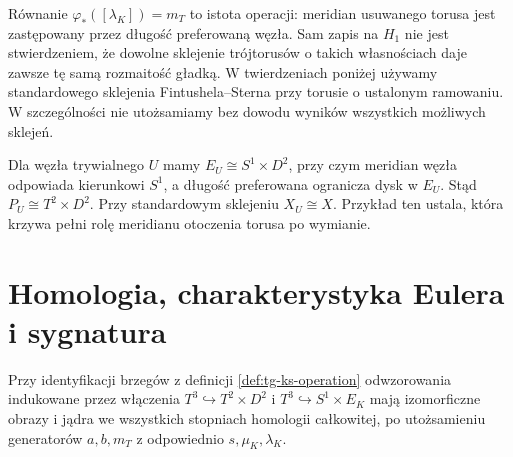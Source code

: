 \begin{uwaga}
Równanie $\varphi_*([\lambda_K])=m_T$ to istota
operacji: meridian usuwanego torusa jest zastępowany
przez długość preferowaną węzła. Sam zapis na $H_1$
nie jest stwierdzeniem, że dowolne sklejenie trójtorusów
o takich własnościach daje zawsze tę samą rozmaitość
gładką. W twierdzeniach poniżej używamy standardowego
sklejenia Fintushela--Sterna przy torusie o ustalonym
ramowaniu. W szczególności nie utożsamiamy bez dowodu
wyników wszystkich możliwych sklejeń.
\end{uwaga}

\begin{center}
\end{center}

\begin{przyklad}
Dla węzła trywialnego $U$ mamy $E_U\cong S^1\times D^2$,
przy czym meridian węzła odpowiada kierunkowi $S^1$,
a długość preferowana ogranicza dysk w $E_U$.
Stąd $P_U\cong T^2\times D^2$. Przy standardowym sklejeniu
$X_U\cong X$. Przykład ten ustala, która krzywa
pełni rolę meridianu otoczenia torusa po wymianie.
\end{przyklad}

\section{Homologia, charakterystyka Eulera i sygnatura}
\label{sec:tg-ks-homology}

\begin{stwierdzenie}
\label{prop:tg-ks-boundary-maps}
Przy identyfikacji brzegów z definicji
\ref{def:tg-ks-operation} odwzorowania indukowane
przez włączenia $T^3\hookrightarrow T^2\times D^2$
i $T^3\hookrightarrow S^1\times E_K$ mają izomorficzne
obrazy i jądra we wszystkich stopniach homologii
całkowitej, po utożsamieniu generatorów $a,b,m_T$
z odpowiednio $s,\mu_K,\lambda_K$.
\end{stwierdzenie}

